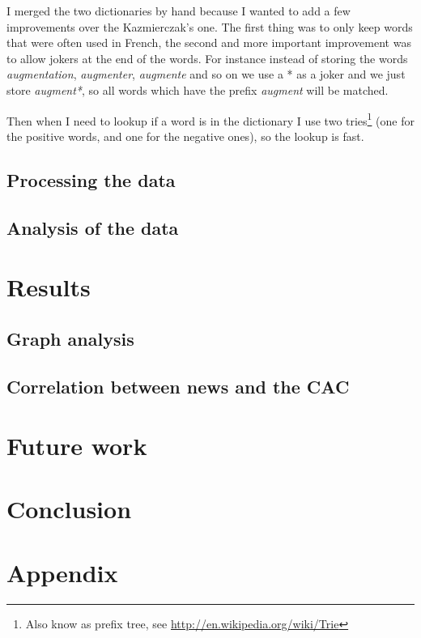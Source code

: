 \documentclass[12pt,a4wide]{report}
\begin{document}
			I merged the two dictionaries by hand because I wanted to add a few improvements over the Kazmierczak's one. The first thing was to only keep words that were often used in French, the second and more important improvement was to allow jokers at the end of the words. For instance instead of storing the words \emph{augmentation}, \emph{augmenter}, \emph{augmente} and so on we use a * as a joker and we just store \emph{augment*}, so all words which have the prefix \emph{augment} will be matched.
			
			Then when I need to lookup if a word is in the dictionary I use two tries\footnote{Also know as prefix tree, see \url{http://en.wikipedia.org/wiki/Trie}} (one for the positive words, and one for the negative ones), so the lookup is fast.
			
		\section{Processing the data}
			
		\section{Analysis of the data}
	\chapter{Results}
		\section{Graph analysis}
		
		\section{Correlation between news and the CAC}
	
	\chapter{Future work}	
	
	\chapter{Conclusion}
	
	\chapter{Appendix}
		
\end{document}
